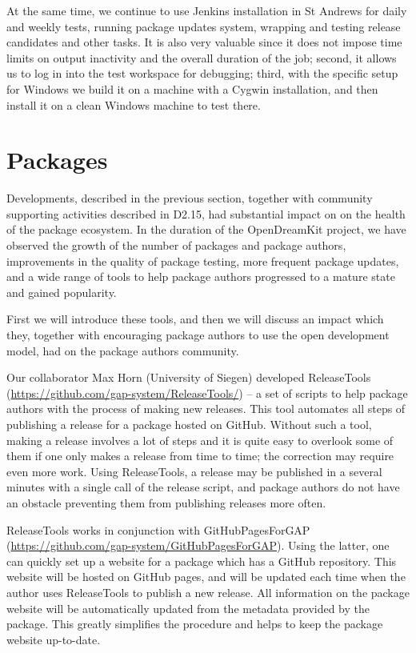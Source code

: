 \documentclass{deliverablereport}
\begin{document}
At the same time, we continue to use Jenkins installation in St Andrews 
for daily and weekly tests, running package updates system, wrapping and
testing release candidates and other tasks. It is also very valuable since 
it does not impose time limits on output inactivity and the overall duration
of the job; second, it allows us to log in into the test workspace for
debugging; third, with the specific \GAP setup for Windows we build it on a
machine with a Cygwin installation, and then install it on a clean Windows
machine to test there. 

\section{\GAP Packages}\label{packages}

Developments, described in the previous section, together with community
supporting activities described in D2.15,  had substantial
impact on on the health of the package ecosystem. In the duration of the OpenDreamKit
project, we have observed the growth of the number of \GAP packages and package 
authors, improvements in the quality of package testing, more frequent
package updates, and a wide range of tools to help package authors progressed
to a mature state and gained popularity.

First we will introduce these tools, and then we will discuss an impact which
they, together with encouraging package authors to use the open development
model, had on the package authors community.

Our collaborator Max Horn (University of Siegen) developed {\sf ReleaseTools}
(\url{https://github.com/gap-system/ReleaseTools/})
-- a set of scripts to help package authors with the process of making new 
releases. This tool automates all steps of publishing a release for a \GAP package
hosted on GitHub. Without such a tool, making a release involves a lot of steps
and it is quite easy to overlook some of them if one only makes a release from 
time to time; the correction may require even more work. Using {\sf ReleaseTools},
a release may be published in a several minutes with a single call of the release
script, and package authors do not have an obstacle preventing them from publishing
releases more often.

{\sf ReleaseTools} works in conjunction with {\sf GitHubPagesForGAP}
(\url{https://github.com/gap-system/GitHubPagesForGAP}). Using the
latter, one can quickly set up a website for a \GAP package which has
a GitHub repository. This website will be hosted on GitHub pages,
and will be updated each time when the author uses {\sf ReleaseTools}
to publish a new release. All information on the package
website will be automatically updated from the metadata provided by
the package. This greatly simplifies the procedure and helps to keep 
the package website up-to-date.
\end{document}
